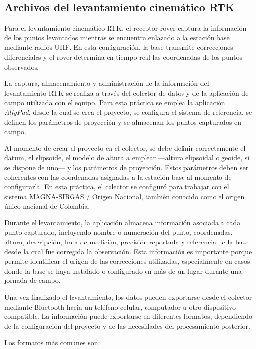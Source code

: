 \documentclass[
  letterpaper,
  DIV=11,
  numbers=noendperiod]{scrartcl}
\begin{document}
\subsection{Archivos del levantamiento cinemático
RTK}\label{archivos-del-levantamiento-cinemuxe1tico-rtk}

Para el levantamiento cinemático RTK, el receptor rover captura la
información de los puntos levantados mientras se encuentra enlazado a la
estación base mediante radios UHF. En esta configuración, la base
transmite correcciones diferenciales y el rover determina en tiempo real
las coordenadas de los puntos observados.

La captura, almacenamiento y administración de la información del
levantamiento RTK se realiza a través del colector de datos y de la
aplicación de campo utilizada con el equipo. Para esta práctica se
emplea la aplicación \emph{AllyPad}, desde la cual se crea el proyecto,
se configura el sistema de referencia, se definen los parámetros de
proyección y se almacenan los puntos capturados en campo.

Al momento de crear el proyecto en el colector, se debe definir
correctamente el datum, el elipsoide, el modelo de altura a emplear
---altura elipsoidal o geoide, si se dispone de uno--- y los parámetros
de proyección. Estos parámetros deben ser coherentes con las coordenadas
asignadas a la estación base al momento de configurarla. En esta
práctica, el colector se configuró para trabajar con el sistema
MAGNA-SIRGAS / Origen Nacional, también conocido como el origen único
nacional de Colombia.

Durante el levantamiento, la aplicación almacena información asociada a
cada punto capturado, incluyendo nombre o numeración del punto,
coordenadas, altura, descripción, hora de medición, precisión reportada
y referencia de la base desde la cual fue corregida la observación. Esta
información es importante porque permite identificar el origen de las
correcciones utilizadas, especialmente en casos donde la base se haya
instalado o configurado en más de un lugar durante una jornada de campo.

Una vez finalizado el levantamiento, los datos pueden exportarse desde
el colector mediante Bluetooth hacia un teléfono celular, computador u
otro dispositivo compatible. La información puede exportarse en
diferentes formatos, dependiendo de la configuración del proyecto y de
las necesidades del procesamiento posterior.

Los formatos más comunes son:
\end{document}
